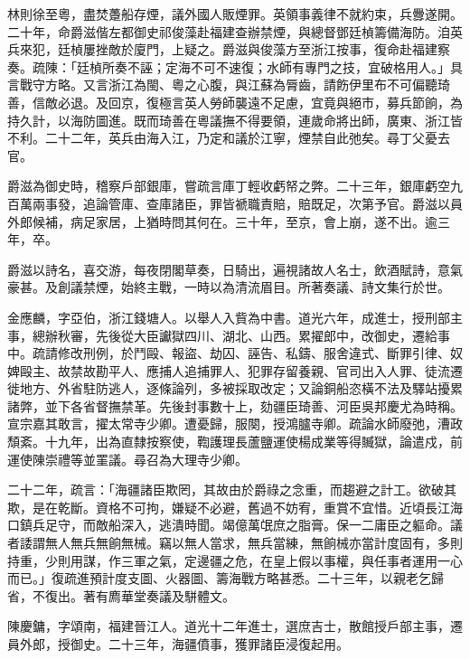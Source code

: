 \begin{pinyinscope}
林則徐至粵，盡焚躉船存煙，議外國人販煙罪。英領事義律不就約束，兵釁遂開。二十年，命爵滋偕左都御史祁俊藻赴福建查辦禁煙，與總督鄧廷楨籌備海防。洎英兵來犯，廷楨屢挫敵於廈門，上疑之。爵滋與俊藻方至浙江按事，復命赴福建察奏。疏陳：「廷楨所奏不誣；定海不可不速復；水師有專門之技，宜破格用人。」具言戰守方略。又言浙江為閩、粵之心腹，與江蘇為脣齒，請飭伊里布不可偏聽琦善，信敵必退。及回京，復極言英人勞師襲遠不足慮，宜竟與絕市，募兵節餉，為持久計，以海防圖進。既而琦善在粵議撫不得要領，連歲命將出師，廣東、浙江皆不利。二十二年，英兵由海入江，乃定和議於江寧，煙禁自此弛矣。尋丁父憂去官。

爵滋為御史時，稽察戶部銀庫，嘗疏言庫丁輕收虧帑之弊。二十三年，銀庫虧空九百萬兩事發，追論管庫、查庫諸臣，罪皆褫職責賠，賠既足，次第予官。爵滋以員外郎候補，病足家居，上猶時問其何在。三十年，至京，會上崩，遂不出。逾三年，卒。

爵滋以詩名，喜交游，每夜閉閣草奏，日騎出，遍視諸故人名士，飲酒賦詩，意氣豪甚。及創議禁煙，始終主戰，一時以為清流眉目。所著奏議、詩文集行於世。

金應麟，字亞伯，浙江錢塘人。以舉人入貲為中書。道光六年，成進士，授刑部主事，總辦秋審，先後從大臣讞獄四川、湖北、山西。累擢郎中，改御史，遷給事中。疏請修改刑例，於鬥毆、報盜、劫囚、誣告、私鑄、服舍違式、斷罪引律、奴婢毆主、故禁故勘平人、應捕人追捕罪人、犯罪存留養親、官司出入人罪、徒流遷徙地方、外省駐防逃人，逐條論列，多被採取改定；又論銅船恣橫不法及驛站擾累諸弊，並下各省督撫禁革。先後封事數十上，劾疆臣琦善、河臣吳邦慶尤為時稱。宣宗嘉其敢言，擢太常寺少卿。遭憂歸，服闋，授鴻臚寺卿。疏論水師廢弛，漕政頹紊。十九年，出為直隸按察使，鞫護理長蘆鹽運使楊成業等得贓獄，論遣戍，前運使陳崇禮等並罣議。尋召為大理寺少卿。

二十二年，疏言：「海疆諸臣欺罔，其故由於爵祿之念重，而趨避之計工。欲破其欺，是在乾斷。資格不可拘，嫌疑不必避，舊過不妨宥，重賞不宜惜。近頃長江海口鎮兵足守，而敵船深入，逃潰時聞。竭億萬氓庶之脂膏。保一二庸臣之軀命。議者諉謂無人無兵無餉無械。竊以無人當求，無兵當練，無餉械亦當計度固有，多則持重，少則用謀，作三軍之氣，定邊疆之危，在皇上假以事權，與任事者運用一心而已。」復疏進預計度支圖、火器圖、籌海戰方略甚悉。二十三年，以親老乞歸省，不復出。著有廌華堂奏議及駢體文。

陳慶鏞，字頌南，福建晉江人。道光十二年進士，選庶吉士，散館授戶部主事，遷員外郎，授御史。二十三年，海疆僨事，獲罪諸臣浸復起用。


\end{pinyinscope}
